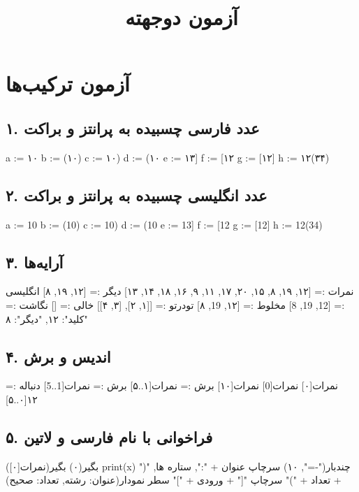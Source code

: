 \documentclass[11pt,openany]{book}
\title{آزمون دوجهته}
\author{}
\date{}
\begin{document}
\chapter*{آزمون ترکیب‌ها}

\section*{۱. عدد فارسی چسبیده به پرانتز و براکت}
\begin{salamfa}
    a := ۱۰
    b := (۱۰)
    c := ۱۰)
    d := (۱۰
    e := ۱۳]
    f := [۱۲
    g := [۱۲]
    h := ۱۲(۳۴)
\end{salamfa}

\section*{۲. عدد انگلیسی چسبیده به پرانتز و براکت}
\begin{salamfa}
    a := 10
    b := (10)
    c := 10)
    d := (10
    e := 13]
    f := [12
    g := [12]
    h := 12(34)
\end{salamfa}

\section*{۳. آرایه‌ها}
\begin{salamfa}
    نمرات := [۱۲, ۱۹, ۸, ۱۵, ۲۰, ۱۷, ۱۱, ۹, ۱۶, ۱۸, ۱۴, ۱۳]
    دیگر := [۱۲, ۱۹, ۸]
    انگلیسی := [12, 19, 8]
    مخلوط := [۱۲, 19, ۸]
    تودرتو := [[۱, ۲], [۳, ۴]]
    خالی := []
    نگاشت := {"کلید": ۱۲, "دیگر": ۸}
\end{salamfa}

\section*{۴. اندیس و برش}
\begin{salamfa}
    نمرات[۰]
    نمرات[0]
    نمرات[۱۰]
    برش := نمرات[۱..۵]
    برش := نمرات[1..5]
    دنباله := ۱۲[۰..۵]
\end{salamfa}

\section*{۵. فراخوانی با نام فارسی و لاتین}
\begin{salamfa}
    بگیر(۰)
    بگیر(نمرات[۰])
    print(x)
    چندبار("-=", ۱۰)
    سرچاپ عنوان + ":", ستاره ها, "(" + تعداد + ")"
    سرچاپ "[" + ورودی + "]"
    سطر نمودار(عنوان: رشته, تعداد: صحیح)
\end{salamfa}
\end{document}
